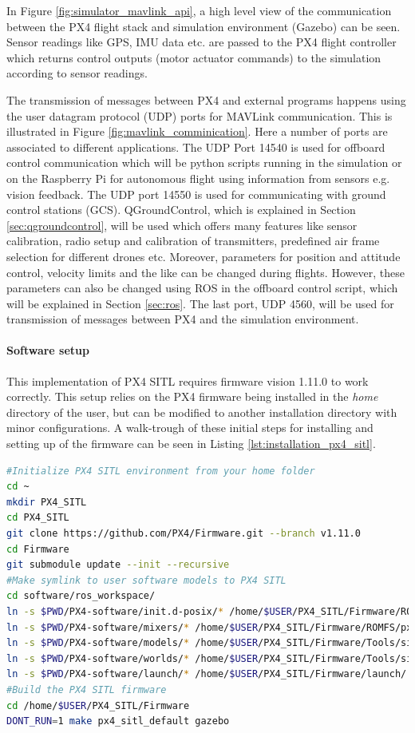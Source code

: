 \documentclass[../Head/report.tex]{subfiles}
\begin{document}
In Figure \ref{fig:simulator_mavlink_api}, a high level view of the communication between the PX4 flight stack and simulation environment (Gazebo) can be seen. Sensor readings like GPS, IMU data etc. are passed to the PX4 flight controller which returns control outputs (motor actuator commands) to the simulation according to sensor readings. 

The transmission of messages between PX4 and external programs happens using  the user datagram protocol (UDP) ports for MAVLink communication. This is illustrated in Figure \ref{fig:mavlink_comminication}. Here a number of ports are associated to different applications. The UDP Port 14540 is used for offboard control communication which will be python scripts running in the simulation or on the Raspberry Pi for autonomous flight using information from sensors e.g. vision feedback. The UDP port 14550 is used for communicating with ground control stations (GCS). QGroundControl, which is explained in Section \ref{sec:qgroundcontrol},  will be used which offers many features like sensor calibration, radio setup and calibration of transmitters, predefined air frame selection for different drones etc. Moreover, parameters for position and attitude control, velocity limits and the like can be changed during flights. However, these parameters can also be changed using ROS in the offboard control script, which will be explained in Section \ref{sec:ros}. The last port, UDP 4560, will be used for transmission of messages between PX4 and the simulation environment.

\paragraph{Software setup}

This implementation of PX4 SITL requires firmware vision 1.11.0 to work correctly. This setup relies on the PX4 firmware being installed in the \textit{home} directory of the user, but can be modified to another installation directory with minor configurations. A walk-trough of these initial steps for installing and setting up of the firmware can be seen in Listing \ref{lst:installation_px4_sitl}. 

\begin{lstlisting}[language=bash, frame=none, caption={Installation and setting up of the PX4 SITL firmware},label=lst:installation_px4_sitl]
#Initialize PX4 SITL environment from your home folder
cd ~
mkdir PX4_SITL
cd PX4_SITL
git clone https://github.com/PX4/Firmware.git --branch v1.11.0
cd Firmware
git submodule update --init --recursive
#Make symlink to user software models to PX4 SITL
cd software/ros_workspace/
ln -s $PWD/PX4-software/init.d-posix/* /home/$USER/PX4_SITL/Firmware/ROMFS/px4fmu_common/init.d-posix/
ln -s $PWD/PX4-software/mixers/* /home/$USER/PX4_SITL/Firmware/ROMFS/px4fmu_common/mixers/
ln -s $PWD/PX4-software/models/* /home/$USER/PX4_SITL/Firmware/Tools/sitl_gazebo/models/
ln -s $PWD/PX4-software/worlds/* /home/$USER/PX4_SITL/Firmware/Tools/sitl_gazebo/worlds/
ln -s $PWD/PX4-software/launch/* /home/$USER/PX4_SITL/Firmware/launch/
#Build the PX4 SITL firmware
cd /home/$USER/PX4_SITL/Firmware
DONT_RUN=1 make px4_sitl_default gazebo
\end{lstlisting}
\end{document}

